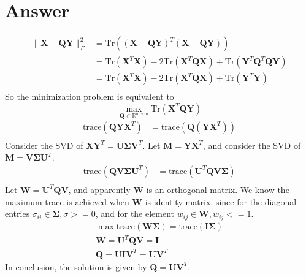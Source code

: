\documentclass{article}
\newcommand{\R}{\mathbb{R}}
\begin{document}
\section*{Answer}
\begin{align*}
    \|\bm{X} - \bm{Q}\bm{Y}\|_F^2 &= \text{Tr}((\bm{X} - \bm{QY})^T(\bm{X} - \bm{QY})) \\
    &= \text{Tr}(\bm{X}^T\bm{X}) - 2\text{Tr}(\bm{X}^T\bm{Q}\bm{X}) + \text{Tr}(\bm{Y}^T\bm{Q}^T\bm{QY}) \\
    &= \text{Tr}(\bm{X}^T\bm{X}) - 2\text{Tr}(\bm{X}^T\bm{Q}\bm{X}) + \text{Tr}(\bm{Y}^T\bm{Y}) \\
\end{align*}
So the minimization problem is equivalent to
\[
    \max_{\bm{Q}\in\R^{m\times m}} \text{Tr}(\bm{X}^T\bm{Q}\bm{Y}) 
\]
\begin{align*}
    \text{trace}(\bm{Q}\bm{Y}\bm{X}^T) &= \text{trace}(\bm{Q}(\bm{Y}\bm{X}^T)) \\
\end{align*}
Consider the SVD of \(\bm{X}\bm{Y}^T = \bm{U}\bm{\Sigma}\bm{V}^T\).
Let \(\bm{M} = \bm{Y}\bm{X}^T\), and consider the SVD of \(\bm{M} = \bm{V}\bm{\Sigma}\bm{U}^T\).
\begin{align*}
    \text{trace}(\bm{Q}\bm{V}\bm{\Sigma}\bm{U}^T) &= \text{trace}(\bm{U}^T\bm{Q}\bm{V}\bm{\Sigma}) \\
\end{align*}
Let \(\bm{W} = \bm{U}^T\bm{Q}\bm{V}\), and apparently \(\bm{W}\) is an orthogonal matrix.
We know the maximum trace is achieved when \(\bm{W}\) is identity matrix, since for the diagonal entries \( \sigma_{ii} \in \bm{\Sigma}, \sigma >= 0\), and for the element \(w_{ij} \in \bm{W}, w_{ij} <= 1\).
\begin{align*}
    \max \text{trace}(\bm{W}\bm{\Sigma}) = \text{trace}(\bm{I}\bm{\Sigma}) \\
    \bm{W} = \bm{U}^T\bm{Q}\bm{V} = \bm{I} \\
    \bm{Q} = \bm{U}\bm{I}\bm{V}^T = \bm{U}\bm{V}^T 
\end{align*}
In conclusion, the solution is given by \(\bm{Q} = \bm{U}\bm{V}^T\).
\end{document}
